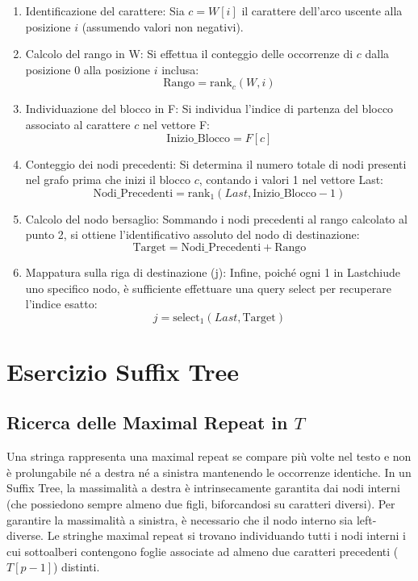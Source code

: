 \documentclass[a4paper,11pt]{article}
\begin{document}
\begin{enumerate}
    \item Identificazione del carattere: Sia $c = W[i]$ il carattere dell'arco uscente alla posizione $i$ (assumendo valori non negativi).
    \item Calcolo del rango in W: Si effettua il conteggio delle occorrenze di $c$ dalla posizione 0 alla posizione $i$ inclusa:
    $$ \text{Rango} = \text{rank}_c(W, i) $$
    \item Individuazione del blocco in F: Si individua l'indice di partenza del blocco associato al carattere $c$ nel vettore F:
    $$ \text{Inizio\_Blocco} = F[c] $$
    \item Conteggio dei nodi precedenti: Si determina il numero totale di nodi presenti nel grafo prima che inizi il blocco $c$, contando i valori 1 nel vettore Last:
    $$ \text{Nodi\_Precedenti} = \text{rank}_1(Last, \text{Inizio\_Blocco} - 1) $$
    \item Calcolo del nodo bersaglio: Sommando i nodi precedenti al rango calcolato al punto 2, si ottiene l'identificativo assoluto del nodo di destinazione:
    $$ \text{Target} = \text{Nodi\_Precedenti} + \text{Rango} $$
    \item Mappatura sulla riga di destinazione (j): Infine, poiché ogni 1 in Lastchiude uno specifico nodo, è sufficiente effettuare una query select per recuperare l'indice esatto:
    $$ j = \text{select}_1(Last, \text{Target}) $$
\end{enumerate}


\section{Esercizio Suffix Tree}

\subsection{Ricerca delle Maximal Repeat in $T$}
Una stringa rappresenta una maximal repeat se compare più volte nel testo e non è prolungabile né a destra né a sinistra mantenendo le occorrenze identiche.
In un Suffix Tree, la massimalità a destra è intrinsecamente garantita dai nodi interni (che possiedono sempre almeno due figli, biforcandosi su caratteri diversi).
Per garantire la massimalità a sinistra, è necessario che il nodo interno sia left-diverse. Le stringhe maximal repeat si trovano individuando tutti i nodi interni i cui sottoalberi contengono foglie associate ad almeno due caratteri precedenti ($T[p-1]$) distinti.
\end{document}
